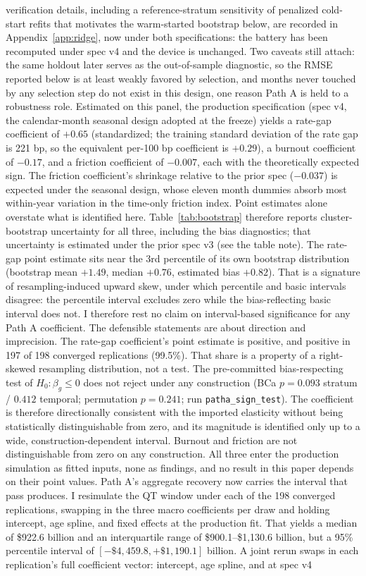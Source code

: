 \documentclass[12pt]{article}
\begin{document}
verification details, including a reference-stratum sensitivity of penalized cold-start refits that motivates the warm-started bootstrap below, are recorded in Appendix~\ref{app:ridge}, now under both specifications: the battery has been recomputed under spec v4 and the device is unchanged. Two caveats still attach: the same holdout later serves as the out-of-sample diagnostic, so the RMSE reported below is at least weakly favored by selection, and months never touched by any selection step do not exist in this design, one reason Path A is held to a robustness role.
Estimated on this panel, the production specification (spec v4, the calendar-month seasonal design adopted at the freeze) yields a rate-gap coefficient of $+0.65$ (standardized; the training standard deviation of the rate gap is 221 bp, so the equivalent per-100 bp coefficient is $+0.29$), a burnout coefficient of $-0.17$, and a friction coefficient of $-0.007$, each with the theoretically expected sign. The friction coefficient's shrinkage relative to the prior spec ($-0.037$) is expected under the seasonal design, whose eleven month dummies absorb most within-year variation in the time-only friction index. Point estimates alone overstate what is identified here. Table~\ref{tab:bootstrap} therefore reports cluster-bootstrap uncertainty for all three, including the bias diagnostics; that uncertainty is estimated under the prior spec v3 (see the table note). The rate-gap point estimate sits near the 3rd percentile of its own bootstrap distribution (bootstrap mean $+1.49$, median $+0.76$, estimated bias $+0.82$). That is a signature of resampling-induced upward skew, under which percentile and basic intervals disagree: the percentile interval excludes zero while the bias-reflecting basic interval does not. I therefore rest no claim on interval-based significance for any Path A coefficient. The defensible statements are about direction and imprecision. The rate-gap coefficient's point estimate is positive, and positive in 197 of 198 converged replications (99.5\%). That share is a property of a right-skewed resampling distribution, not a test. The pre-committed bias-respecting test of $H_0\!: \beta_g \le 0$ does not reject under any construction (BCa $p = 0.093$ stratum / $0.412$ temporal; permutation $p = 0.241$; run \texttt{patha\_sign\_test}). The coefficient is therefore directionally consistent with the imported elasticity without being statistically distinguishable from zero, and its magnitude is identified only up to a wide, construction-dependent interval. Burnout and friction are not distinguishable from zero on any construction. All three enter the production simulation as fitted inputs, none as findings, and no result in this paper depends on their point values. Path A's aggregate recovery now carries the interval that pass produces. I resimulate the QT window under each of the 198 converged replications, swapping in the three macro coefficients per draw and holding intercept, age spline, and fixed effects at the production fit. That yields a median of \$922.6 billion and an interquartile range of \$900.1--\$1{,}130.6 billion, but a 95\% percentile interval of $[-\$4{,}459.8, +\$1{,}190.1]$ billion. A joint rerun swaps in each replication's full coefficient vector: intercept, age spline, and at spec v4 
\end{document}
